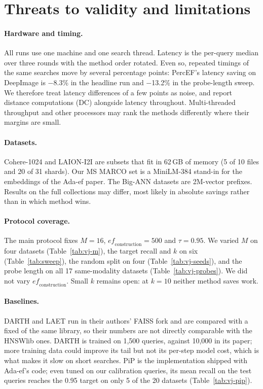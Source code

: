\section{Threats to validity and limitations}\label{sec:limitations}

\paragraph{Hardware and timing.}
All runs use one machine and one search thread. Latency is the per-query median over three rounds
with the method order rotated. Even so, repeated timings of the same searches move by several
percentage points: PercEF's latency saving on DeepImage is $-$8.3\% in the headline run and
$-$13.2\% in the probe-length sweep. We therefore treat latency differences of a few points as
noise, and report distance computations (DC) alongside latency throughout. Multi-threaded
throughput and other processors may rank the methods differently where their margins are small.

\paragraph{Datasets.}
Cohere-1024 and LAION-I2I are subsets that fit in 62\,GB of memory (5 of 10 files and 20 of 31
shards). Our MS MARCO set is a MiniLM-384 stand-in for the embeddings of the Ada-ef paper. The
Big-ANN datasets are 2M-vector prefixes. Results on the full collections may differ, most likely in
absolute savings rather than in which method wins.

\paragraph{Protocol coverage.}
The main protocol fixes $M = 16$, $\mathit{ef}_{\mathrm{construction}} = 500$ and $\tau = 0.95$. We
varied $M$ on four datasets (Table~\ref{tab:vj-m}), the target recall and $k$ on six
(Table~\ref{tab:sweep}), the random split on four (Table~\ref{tab:vj-seeds}), and the probe length on
all 17 same-modality datasets (Table~\ref{tab:vj-probes}). We did not vary
$\mathit{ef}_{\mathrm{construction}}$. Small $k$ remains open: at $k = 10$ neither method saves work.

\paragraph{Baselines.}
DARTH and LAET run in their authors' FAISS fork and are compared with a fixed \ef{} of the same
library, so their numbers are not directly comparable with the HNSWlib ones. DARTH is trained on
1,500 queries, against 10,000 in its paper; more training data could improve its tail but not its
per-step model cost, which is what makes it slow on short searches. PiP is the implementation
shipped with Ada-ef's code; even tuned on our calibration queries, its mean recall on the test
queries reaches the 0.95 target on only 5 of the 20 datasets (Table~\ref{tab:vj-pip}).

